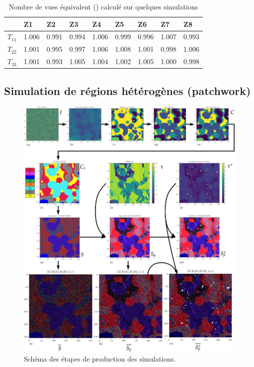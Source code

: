 \begin{table}[]
\begin{tabular}{|l|l|l|l|l|l|l|l|l|}
\hline
            &\textbf{Z1} & \textbf{Z2}& \textbf{Z3} &\textbf{Z4}& \textbf{Z5}& \textbf{Z6}&\textbf{Z7}&\textbf{Z8}\\ \hline\hline
$T_{11}$    & 1.006 &   0.991   &   0.994   &   1.006   &   0.999   &   0.996   &   1.007   &0.993 \\ \hline
$T_{22}$    & 1.001 &   0.995   &   0.997   &   1.006   &   1.008   &   1.001   &   0.998   &1.006  \\ \hline
$T_{33}$    & 1.001 &   0.993   &   1.005   &   1.004   &   1.002   &   1.005   &   1.000   &0.998  \\ \hline
\end{tabular}
 \caption{
  \small{Nombre de vues équivalent (\acrenl) calculé sur quelques simulations}
  }
  \label{tab:homogeneous_enl_table}
\end{table}

\subsection{Simulation de régions hétérogènes (patchwork)} \label{section:simulation_heterogeneous_regions}

\begin{figure}
  \includegraphics[width=1.1\linewidth]{figures/Chap3/samples_production_diagram.jpg}
  \centering
  \caption{
  \small{Schéma des étapes de production des simulations. }
  }
  \label{fig:samples_production_diagram}
\end{figure}

